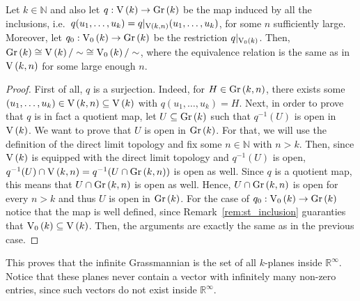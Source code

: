 \begin{proposition} Let $k\in\mathbb{N}$ and also let $q:\St{k}\to\Gr{k}$ be the map induced by all the inclusions, i.e.\ $q(u_1,\ldots,u_k)=q|_{\St{k}{n}}(u_1,\ldots,u_k)$, for some $n$ sufficiently large. Moreover, let $q_0:\StO{k}\to\Gr{k}$ be the restriction $q|_{\StO{k}}$. Then, $\Gr{k}\cong{\St{k}/\sim}\cong{\StO{k}/\sim}$, where the equivalence relation is the same as in $\St{k}{n}$ for some large enough $n$.
\end{proposition}
\begin{proof} First of all, $q$ is a surjection. Indeed, for $H\in\Gr{k}{n}$, there exists some $(u_1,\ldots,u_k)\in\St{k}{n}\subseteq\St{k}$ with $q(u_1,\ldots,u_k)=H$. Next, in order to prove that $q$ is in fact a quotient map, let $U\subseteq\Gr{k}$ such that $q^{-1}(U)$ is open in $\St{k}$. We want to prove that $U$ is open in $\Gr{k}$. For that, we will use the definition of the direct limit topology and fix some $n\in\mathbb{N}$ with $n>k$. Then, since $\St{k}$ is equipped with the direct limit topology and $q^{-1}(U)$ is open, $q^{-1}(U)\cap\St{k}{n}=q^{-1}(U\cap\Gr{k}{n})$ is open as well. Since $q$ is a quotient map, this means that $U\cap\Gr{k}{n}$ is open as well. Hence, $U\cap\Gr{k}{n}$ is open for every $n>k$ and thus $U$ is open in $\Gr{k}$. For the case of $q_0:\StO{k}\to\Gr{k}$ notice that the map is well defined, since Remark~\ref{rem:st_inclusion} guaranties that $\StO{k}\subseteq\St{k}$. Then, the arguments are exactly the same as in the previous case.
\end{proof}
This proves that the infinite Grassmannian is the set of all $k$-planes inside $\mathbb{R}^{\infty}$. Notice that these planes never contain a vector with infinitely many non-zero entries, since such vectors do not exist inside $\mathbb{R}^{\infty}$.

